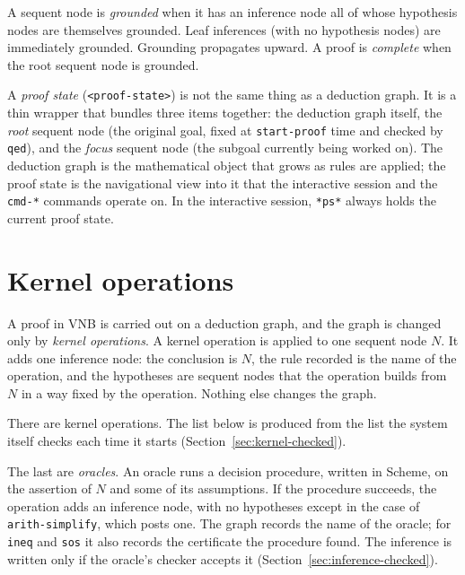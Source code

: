 A sequent node is \emph{grounded} when it has an inference node all of
whose hypothesis nodes are themselves grounded.  Leaf inferences (with no
hypothesis nodes) are immediately grounded.  Grounding propagates upward.
A proof is \emph{complete} when the root sequent node is grounded.

\begin{remark}
A \emph{proof state} (\texttt{<proof-state>}) is not the same thing as a
deduction graph.  It is a thin wrapper that bundles three items together: the
deduction graph itself, the \emph{root} sequent node (the original goal,
fixed at \texttt{start-proof} time and checked by \texttt{qed}), and the
\emph{focus} sequent node (the subgoal currently being worked on).  The
deduction graph is the mathematical object that grows as rules are applied;
the proof state is the navigational view into it that the interactive session
and the \texttt{cmd-*} commands operate on.  In the interactive session,
\texttt{*ps*} always holds the current proof state.
\end{remark}

\section{Kernel operations}\label{sec:kernel-boundary}

A proof in VNB is carried out on a deduction graph, and the graph is
changed only by \emph{kernel operations}.  A kernel operation is applied
to one sequent node $N$.  It adds one inference node: the conclusion is
$N$, the rule recorded is the name of the operation, and the hypotheses
are sequent nodes that the operation builds from $N$ in a way fixed by
the operation.  Nothing else changes the graph.

There are \VNBkernelopcount{} kernel operations.  The list below is
produced from the list the system itself checks each time it starts
(Section~\ref{sec:kernel-checked}).

\VNBkerneloptable

The last \VNBkernelopcountoracle{} are \emph{oracles}.  An oracle runs a
decision procedure, written in Scheme, on the assertion of $N$ and some
of its assumptions.  If the procedure succeeds, the operation adds an
inference node, with no hypotheses except in the case of
\texttt{arith-simplify}, which posts one.  The graph records the name of
the oracle; for \texttt{ineq} and \texttt{sos} it also records the
certificate the procedure found.  The inference is written only if the
oracle's checker accepts it (Section~\ref{sec:inference-checked}).

